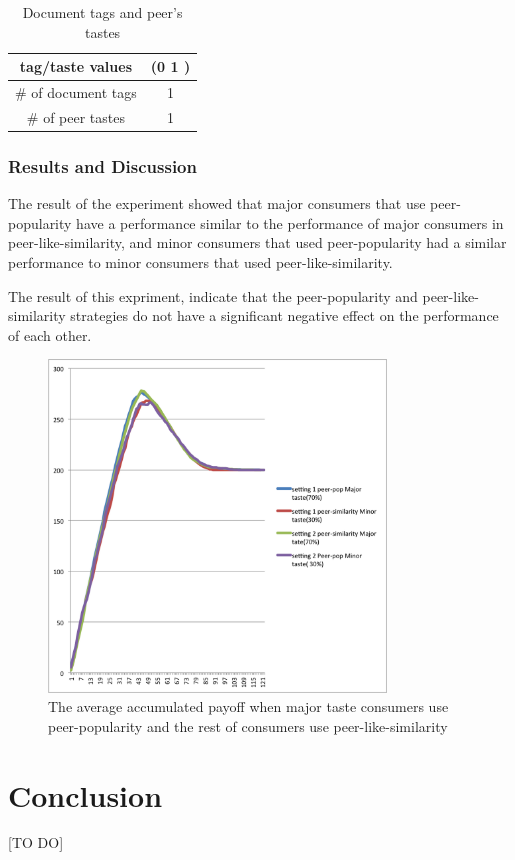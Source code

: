 \documentclass [12pt]{article} \usepackage{multicol}
\begin{document}
\begin{table}[h!]
\caption{Document tags and peer's tastes}

\begin{center}

\begin{tabular}{|c|c|}
\hline tag/taste values & (0 1 )\\
\hline \# of document tags   &  1\\ \hline 
\# of peer tastes  &  1 \\ \hline 
\end{tabular}

\end{center}
\label{default}
\end{table}


\subsubsection{Results and Discussion}

The result of the experiment showed that major consumers that use peer-popularity have a performance similar to the performance of major consumers in peer-like-similarity, 
and minor consumers that used peer-popularity had a similar performance to minor consumers that used peer-like-similarity.

The result of this expriment, indicate that the peer-popularity and peer-like-similarity strategies do not have a significant negative effect on the performance of each other. 


\begin{figure}[h!]
\begin{center}
\includegraphics[width=0.8\textwidth,center]{images/EXP13-peer-pop-peer-sim-MajorMinor}
\caption{The average accumulated payoff when major taste consumers use peer-popularity and the rest of consumers use peer-like-similarity}
\end{center}
\end{figure}


\section{Conclusion}
[TO DO]
  	  
\end{document}
